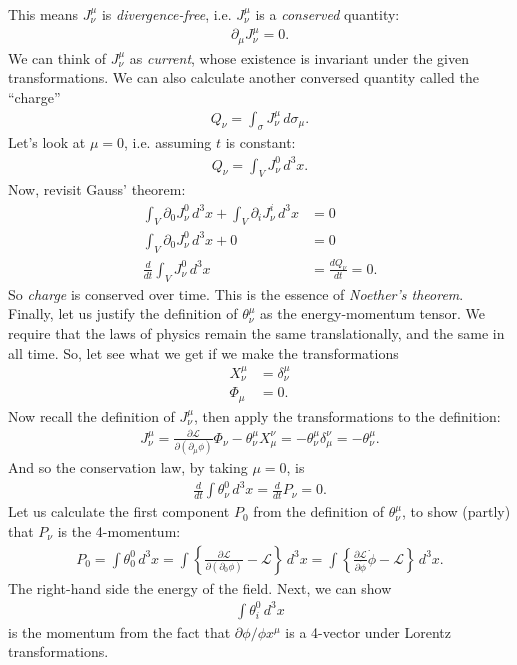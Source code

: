 \documentclass[a4paper,11pt]{article}
\numberwithin{equation}{section}
\theoremstyle{definition}
\newcommand{\p}{\partial}
\newcommand{\lag}{\mathcal{L}}
\begin{document}
This means $J^\mu_\nu$ is \textit{divergence-free}, i.e. $J^\mu_\nu$ is a \textit{conserved} quantity:
\begin{align*}
\p_\mu J^\mu_\nu = 0.
\end{align*}
We can think of $J^\mu_\nu$ as \textit{current}, whose existence is invariant under the given transformations. We can also calculate another conversed quantity called the ``charge''
\begin{align*}
Q_\nu = \int_\sigma J^\mu_\nu\,d\sigma_\mu.
\end{align*}
Let's look at $\mu=0$, i.e. assuming $t$ is constant:
\begin{align*}
Q_\nu = \int_VJ^0_\nu\,d^3x.
\end{align*}
Now, revisit Gauss' theorem:
\begin{align*}
\int_V \p_0 J^0_\nu\,d^3x + \int_V \p_iJ^i_\nu\,d^3x&=0\\
\int_V \p_0 J^0_\nu\,d^3x + 0 &= 0\\
\frac{d}{dt}\int_V J^0_\nu\,d^3x &= \frac{dQ_\nu}{dt} = 0.
\end{align*}
So \textit{charge} is conserved over time. This is the essence of \textit{Noether's theorem}.\\

Finally, let us justify the definition of $\theta^\mu_\nu$ as the energy-momentum tensor. We require that the laws of physics remain the same translationally, and the same in all time. So, let see what we get if we make the transformations
\begin{align*}
X^\mu_\nu &= \delta^\mu_\nu\\
\Phi_\mu &= 0.
\end{align*}
Now recall the definition of $J^\mu_\nu$, then apply the transformations to the definition:
\begin{align*}
J^\mu_\nu = \frac{\p\lag}{\p(\p_\mu\phi)}\Phi_\nu - \theta^\mu_\nu X^\nu_\mu = -\theta^\mu_\nu \delta ^\nu_\mu = -\theta^\mu_\nu.
\end{align*}
And so the conservation law, by taking $\mu=0$, is
\begin{align*}
\frac{d}{dt}\int \theta^0_\nu\,d^3x = \frac{d}{dt}P_\nu= 0.
\end{align*}
Let us calculate the first component $P_0$ from the definition of $\theta^\mu_\nu$, to show (partly) that $P_\nu$ is the 4-momentum:
\begin{align*}
P_0 = \int\theta^0_0\,d^3x = \int\left\{\frac{\p \lag}{\p(\p_0\phi)} - \lag \right\} \,d^3x = \int \left\{
\frac{\p\lag}{\p\dot{\phi}}\dot{\phi} - \lag \right\}\,d^3x. 
\end{align*}
The right-hand side the energy of the field. Next, we can show
\begin{align*}
\int \theta^0_i\,d^3x
\end{align*}
is the momentum from the fact that $\p\phi/\phi x^\mu$ is a 4-vector under Lorentz transformations. \\
\end{document}
